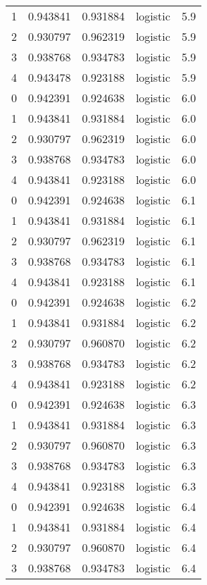 \begin{tabular}{rrrlr}
     1 & 0.943841 & 0.931884 & logistic &        5.9 \\
     2 & 0.930797 & 0.962319 & logistic &        5.9 \\
     3 & 0.938768 & 0.934783 & logistic &        5.9 \\
     4 & 0.943478 & 0.923188 & logistic &        5.9 \\
     0 & 0.942391 & 0.924638 & logistic &        6.0 \\
     1 & 0.943841 & 0.931884 & logistic &        6.0 \\
     2 & 0.930797 & 0.962319 & logistic &        6.0 \\
     3 & 0.938768 & 0.934783 & logistic &        6.0 \\
     4 & 0.943841 & 0.923188 & logistic &        6.0 \\
     0 & 0.942391 & 0.924638 & logistic &        6.1 \\
     1 & 0.943841 & 0.931884 & logistic &        6.1 \\
     2 & 0.930797 & 0.962319 & logistic &        6.1 \\
     3 & 0.938768 & 0.934783 & logistic &        6.1 \\
     4 & 0.943841 & 0.923188 & logistic &        6.1 \\
     0 & 0.942391 & 0.924638 & logistic &        6.2 \\
     1 & 0.943841 & 0.931884 & logistic &        6.2 \\
     2 & 0.930797 & 0.960870 & logistic &        6.2 \\
     3 & 0.938768 & 0.934783 & logistic &        6.2 \\
     4 & 0.943841 & 0.923188 & logistic &        6.2 \\
     0 & 0.942391 & 0.924638 & logistic &        6.3 \\
     1 & 0.943841 & 0.931884 & logistic &        6.3 \\
     2 & 0.930797 & 0.960870 & logistic &        6.3 \\
     3 & 0.938768 & 0.934783 & logistic &        6.3 \\
     4 & 0.943841 & 0.923188 & logistic &        6.3 \\
     0 & 0.942391 & 0.924638 & logistic &        6.4 \\
     1 & 0.943841 & 0.931884 & logistic &        6.4 \\
     2 & 0.930797 & 0.960870 & logistic &        6.4 \\
     3 & 0.938768 & 0.934783 & logistic &        6.4 \\

\end{tabular}
